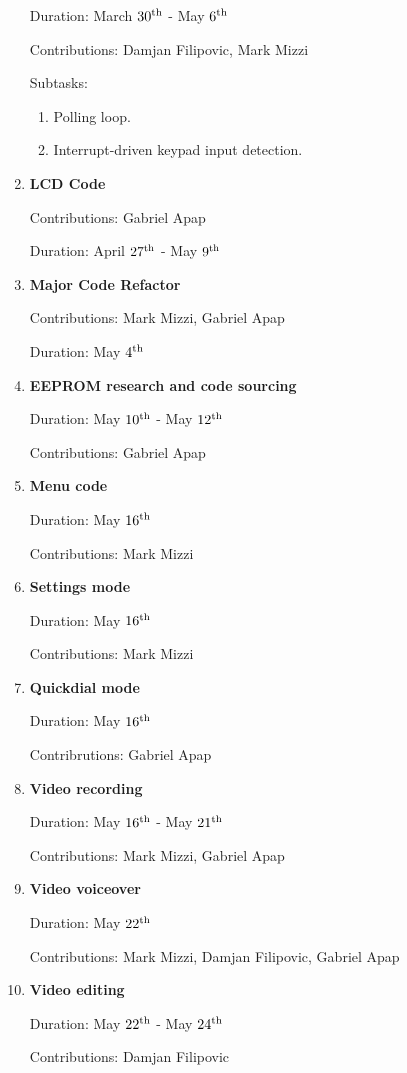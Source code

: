 \documentclass[11pt,a4paper,twocolumn]{scrartcl}
\begin{document}
\begin{enumerate}
      Duration: March $30\textsuperscript{th}$ - May $6\textsuperscript{th}$

      Contributions: Damjan Filipovic, Mark Mizzi

      Subtasks:
      \begin{enumerate}
         \item Polling loop.
         \item Interrupt-driven keypad input detection.
      \end{enumerate}

   \item \textbf{LCD Code}
   
      Contributions: Gabriel Apap
   
      Duration: April $27\textsuperscript{th}$ - May $9\textsuperscript{th}$
      
   \item \textbf{Major Code Refactor}

      Contributions: Mark Mizzi, Gabriel Apap

      Duration: May $4\textsuperscript{th}$

   \item \textbf{EEPROM research and code sourcing} 
   
      Duration: May $10\textsuperscript{th}$ - May $12\textsuperscript{th}$

      Contributions: Gabriel Apap

   \item \textbf{Menu code}
   
      Duration: May $16\textsuperscript{th}$

      Contributions: Mark Mizzi

   \item \textbf{Settings mode}
   
      Duration: May $16\textsuperscript{th}$

      Contributions: Mark Mizzi

   \item \textbf{Quickdial mode}
   
      Duration: May $16\textsuperscript{th}$

      Contribrutions: Gabriel Apap

   \item \textbf{Video recording}
   
      Duration: May $16\textsuperscript{th}$ - May $21\textsuperscript{th}$

      Contributions: Mark Mizzi, Gabriel Apap

   \item \textbf{Video voiceover}
      
      Duration: May $22\textsuperscript{th}$

      Contributions: Mark Mizzi, Damjan Filipovic, Gabriel Apap
   
   \item \textbf{Video editing}
   
      Duration: May $22\textsuperscript{th}$ - May $24\textsuperscript{th}$

      Contributions: Damjan Filipovic
      
\end{enumerate}
\end{document}
